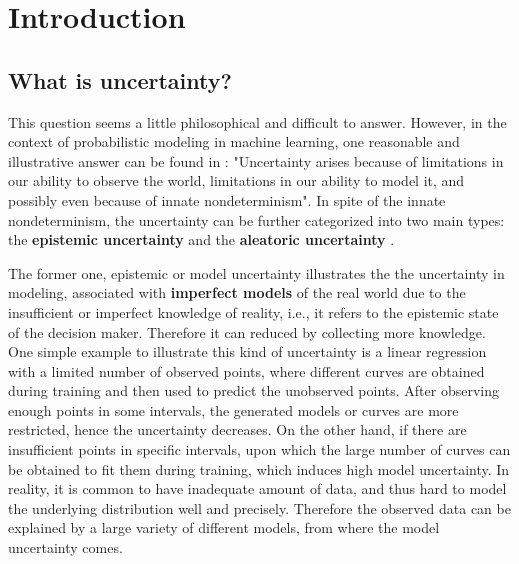 \chapter{Introduction}
\setcounter{page}{1}%
\thispagestyle{empty}

\section{What is uncertainty?}
This question seems a little philosophical and difficult to answer. However, in the context of probabilistic modeling in machine learning, one reasonable and illustrative answer can be found in \cite{koller2009probabilistic}: "Uncertainty arises because of limitations in our ability to observe the world, limitations in our ability to model it, and possibly even because of innate nondeterminism". In spite of the innate nondeterminism, the uncertainty can be further categorized into two main types: the \textbf{epistemic uncertainty} and the \textbf{aleatoric uncertainty} \cite{der2009aleatory, senge2014reliable, kendall2017uncertainties}. 

The former one, epistemic or model uncertainty illustrates the the uncertainty in modeling, associated with \textbf{imperfect models} of the real world due to the insufficient or imperfect knowledge of reality, i.e., it refers to the epistemic state of the decision maker.
Therefore it can reduced by collecting more knowledge. %
One simple example to illustrate this kind of uncertainty is a linear regression with a limited number of observed points, where different curves are obtained during training and then used to predict the unobserved points. After observing enough points in some intervals, the generated models or curves are more restricted, hence the uncertainty decreases. On the other hand, if there are insufficient points in specific intervals, upon which the large number of curves can be obtained to fit them during training, which induces high model uncertainty.  In reality, it is common to have inadequate amount of data, and thus hard to model the underlying distribution well and precisely. Therefore the observed data can be explained by a large variety of different models, from where the model uncertainty comes.

